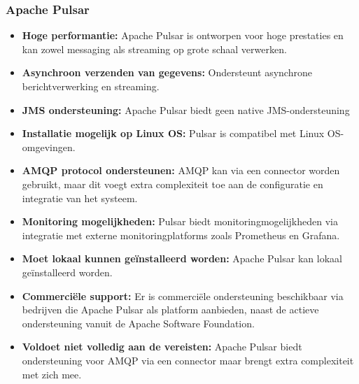 \subsubsection{Apache Pulsar}
\begin{itemize}
    \item \textbf{Hoge performantie:} Apache Pulsar is ontworpen voor hoge prestaties en kan zowel messaging als streaming op grote schaal verwerken.
    \item \textbf{Asynchroon verzenden van gegevens:} Ondersteunt asynchrone berichtverwerking en streaming.
    \item \textbf{JMS ondersteuning:} Apache Pulsar biedt geen native JMS-ondersteuning
    \item \textbf{Installatie mogelijk op Linux OS:} Pulsar is compatibel met Linux OS-omgevingen.
    \item \textbf{AMQP protocol ondersteunen:} AMQP kan via een connector worden gebruikt, maar dit voegt extra complexiteit toe aan de configuratie en integratie van het systeem.
    \item \textbf{Monitoring mogelijkheden:} Pulsar biedt monitoringmogelijkheden via integratie met externe monitoringplatforms zoals Prometheus en Grafana.
    \item \textbf{Moet lokaal kunnen geïnstalleerd worden:} Apache Pulsar kan lokaal geïnstalleerd worden.
    \item \textbf{Commerciële support:} Er is commerciële ondersteuning beschikbaar via bedrijven die Apache Pulsar als platform aanbieden, naast de actieve ondersteuning vanuit de Apache Software Foundation.
    \item \textbf{Voldoet niet volledig aan de vereisten: }Apache Pulsar biedt ondersteuning voor AMQP via een connector maar brengt extra complexiteit met zich mee.
    
\end{itemize}

  
